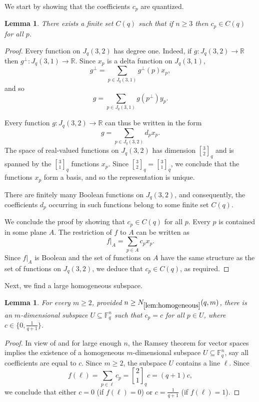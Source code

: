 \documentclass{article}
\newtheorem{lemma}[theorem]{Lemma}
\theoremstyle{definition}
\providecommand{\sqbinom}[2]{\genfrac{[}{]}{0pt}{}{#1}{#2}}
\providecommand{\FF}{\mathbb{F}}
\providecommand{\RR}{\mathbb{R}}
\providecommand{\Cset}{C}
\providecommand{\Nhomo}{N_{\ref{lem:homogeneous}}}
\begin{document}
\bigskip

We start by showing that the coefficients $c_p$ are quantized.

\begin{lemma} \label{lem:quantization}
There exists a finite set $\Cset(q)$ such that if $n \ge 3$ then $c_p \in \Cset(q)$ for all $p$.
\end{lemma}
\begin{proof}
Every function on $J_q(3,2)$ has degree one. Indeed, if $g\colon J_q(3,2) \to \RR$ then $g^\perp\colon J_q(3,1) \to \RR$. Since $x_p$ is a delta function on $J_q(3,1)$,
\[
 g^\perp = \sum_{p \in J_q(3,1)} g^\perp(p) x_p,
\]
and so
\[
 g = \sum_{p \in J_q(3,1)} g(p^\perp) y_p.
\]

Every function $g\colon J_q(3,2) \to \RR$ can thus be written in the form
\[
 g = \sum_{p \in J_q(3,2)} d_p x_p.
\]
The space of real-valued functions on $J_q(3,2)$ has dimension $\sqbinom{3}{2}_q$ and is spanned by the $\sqbinom{3}{1}_q$ functions $x_p$. Since $\sqbinom{3}{2}_q = \sqbinom{3}{1}_q$, we conclude that the functions $x_p$ form a basis, and so the representation is unique.

There are finitely many Boolean functions on $J_q(3,2)$, and consequently, the coefficients $d_p$ occurring in such functions belong to some finite set $\Cset(q)$.

We conclude the proof by showing that $c_p \in \Cset(q)$ for all $p$. Every $p$ is contained in some plane $A$. The restriction of $f$ to $A$ can be written as
\[
 f|_A = \sum_{p \in A} c_p x_p.
\]
Since $f|_A$ is Boolean and the set of functions on $A$ have the same structure as the set of functions on $J_q(3,2)$, we deduce that $c_p \in \Cset(q)$, as required.
\end{proof}

Next, we find a large homogeneous subspace.

\begin{lemma} \label{lem:homogeneous}
For every $m \ge 2$, provided $n \ge \Nhomo(q,m)$, there is an $m$-dimensional subspace $U \subseteq \FF_q^n$ such that $c_p = c$ for all $p \in U$, where $c \in \{0, \frac{1}{q+1}\}$.
\end{lemma}
\begin{proof}
In view of  and for large enough $n$, the Ramsey theorem for vector spaces~\cite{GLR72,Spencer79} implies the existence of a homogeneous $m$-dimensional subspace $U \subseteq \FF_q^n$, say all coefficients are equal to $c$. Since $m \ge 2$, the subspace $U$ contains a line $\ell$. Since
\[
 f(\ell) = \sum_{p \in \ell} c_p = \sqbinom{2}{1}_q c = (q + 1) c,
\]
we conclude that either $c = 0$ (if $f(\ell) = 0$) or $c = \frac{1}{q+1}$ (if $f(\ell) = 1$).
\end{proof}
\end{document}
